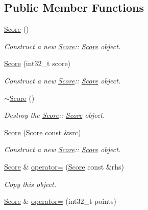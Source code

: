 \subsection*{Public Member Functions}
\begin{DoxyCompactItemize}
\item 
\mbox{\label{class_score_a039c99843551e5e4b512ecee99e46617}} 
\hyperlink{class_score_a039c99843551e5e4b512ecee99e46617}{Score} ()
\begin{DoxyCompactList}\small\item\em Construct a new \hyperlink{class_score}{Score}\+:\+: \hyperlink{class_score}{Score} object. \end{DoxyCompactList}\item 
\hyperlink{class_score_a5648c0fccf943a657e712874d34fb7f5}{Score} (int32\+\_\+t score)
\begin{DoxyCompactList}\small\item\em Construct a new \hyperlink{class_score}{Score}\+:\+: \hyperlink{class_score}{Score} object. \end{DoxyCompactList}\item 
\mbox{\label{class_score_a54ab36a6fdd88696f0176d9534a76883}} 
\hyperlink{class_score_a54ab36a6fdd88696f0176d9534a76883}{$\sim$\+Score} ()
\begin{DoxyCompactList}\small\item\em Destroy the \hyperlink{class_score}{Score}\+:\+: \hyperlink{class_score}{Score} object. \end{DoxyCompactList}\item 
\hyperlink{class_score_ae9cf3eaeba42d057bd3dea4034525164}{Score} (\hyperlink{class_score}{Score} const \&src)
\begin{DoxyCompactList}\small\item\em Construct a new \hyperlink{class_score}{Score}\+:\+: \hyperlink{class_score}{Score} object. \end{DoxyCompactList}\item 
\hyperlink{class_score}{Score} \& \hyperlink{class_score_a4cb0a45369bf4bdaea93c6f840643329}{operator=} (\hyperlink{class_score}{Score} const \&rhs)
\begin{DoxyCompactList}\small\item\em Copy this object. \end{DoxyCompactList}\item 
\hyperlink{class_score}{Score} \& \hyperlink{class_score_ade5285f719702dec177b23568a6f79e3}{operator=} (int32\+\_\+t points)

\end{DoxyCompactItemize}

